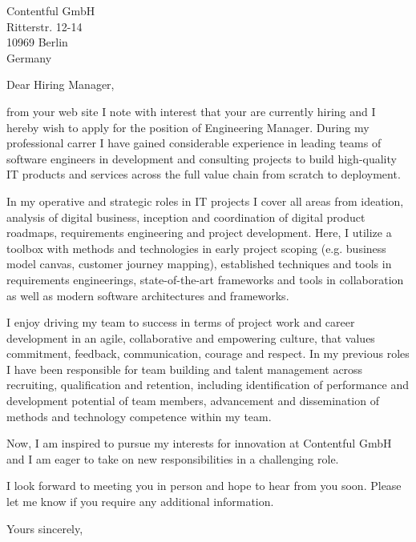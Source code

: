 \documentclass[10pt,a4paper]{dinbrief}
\date{\today}
\begin{document}
 
\begin{letter}  
{%
	Contentful GmbH\\
	Ritterstr. 12-14\\
	10969 Berlin\\
	Germany
}
\subject{\bf Job Application Engineering Manager}
\opening{Dear Hiring Manager,}

from your web site I note with interest that your are currently hiring and I hereby wish to apply for the position of Engineering Manager. During my professional carrer I have gained considerable experience in leading teams of software engineers in development and consulting projects to build high-quality IT products and services across the full value chain from scratch to deployment. 

In my operative and strategic roles in IT projects I cover all areas from ideation, analysis of digital business, inception and coordination of digital product roadmaps, requirements engineering and project development. Here, I utilize a toolbox with methods and technologies in early project scoping (e.g. business model canvas, customer journey mapping), established techniques and tools in requirements engineerings, state-of-the-art frameworks and tools in collaboration as well as modern software architectures and frameworks.

I enjoy driving my team to success in terms of project work and career development in an agile, collaborative and empowering culture, that values commitment, feedback, communication, courage and respect. In my previous roles I have been responsible for team building and talent management across recruiting, qualification and retention, including identification of performance and development potential of team members, advancement and dissemination of methods and technology competence within my team.

Now, I am inspired to pursue my interests for innovation at Contentful GmbH and I am eager to take on new responsibilities in a challenging role.

I look forward to meeting you in person and hope to hear from you soon. Please let me know if you require any additional information.

\closing{Yours sincerely,}
\end{letter}
\end{document}
